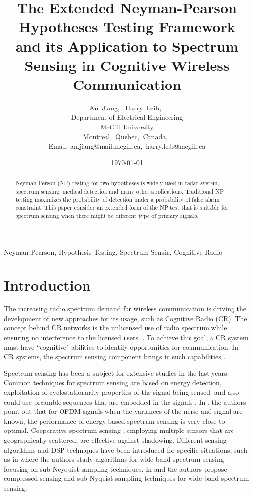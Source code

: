 \documentclass[12pt,journal,a4paper,twoside,doublecolumn]{IEEEtran}
\author{An~Jiang,~
        Harry~Leib,~\\
          Department of Electrical Engineering\\
          McGill University\\
          Montreal,~Quebec,~Canada,~\\
          Email: an.jiang@mail.mcgill.ca,~harry.leib@mcgill.ca
}
\title{The Extended Neyman-Pearson Hypotheses Testing Framework and its Application to Spectrum Sensing in Cognitive Wireless Communication}
\date{\today}
\begin{document}
\begin{spacing}{1.0}
\maketitle
\begin{abstract}
Neyman Person (NP) testing for two hypotheses is widely used in radar system, spectrum sensing, medical detection and many other applications. Traditional NP testing maximizes the probability of detection under a probability of false alarm constraint. This paper consider an extended form of the NP test that is suitable for spectrum sensing when there might be different type of primary signals.
\end{abstract}

\begin{IEEEkeywords}
Neyman Pearson, Hypothesis Testing, Spectrum Sensin, Cognitive Radio
\end{IEEEkeywords}

\section{Introduction}
The increasing radio spectrum demand for wireless communication is driving the development of new approaches for its usage, such as Cognitive Radio (CR)\cite{a001}. The concept behind CR networks is the unlicensed use of radio spectrum while ensuring no interference to the licensed users. \cite{goldsmith2009breaking}.
To achieve this goal, a CR system must have ``cognitive" abilities to identify opportunities for communication\cite{buddhikot2007understanding}. In CR systems, the spectrum sensing component brings in such capabilities \cite{tandra2009spectrum}.

 Spectrum sensing has been a subject for extensive studies in the last years\cite{axell2012spectrum}. Common techniques for spectrum sensing are based on energy detection, exploitation of cyclostationarity properties of  the signal being sensed, and also could use preamble sequences that are embedded in the signals \cite{cabric2004implementation}.  In \cite{axell2011optimal}, the authors point out that for OFDM signals when the variances of the noise and signal are known, the performance of energy based spectrum sensing is very close to optimal. Cooperative spectrum sensing \cite{ganesan2005cooperative}, employing multiple sensors that are geographically scattered, are effective against shadowing.
Different sensing algorithms and DSP techniques have been introduced for specific situations, such as in \cite{tian2007compressed} where the authors study algorithms for wide band spectrum sensing focusing on sub-Neyquist sampling techniques. In  \cite{sun2013wideband} and  \cite{sun2013wideband2} the authors propose compressed sensing and sub-Nyquist sampling techniques for wide band spectrum sensing.


\end{spacing}
\end{document}
